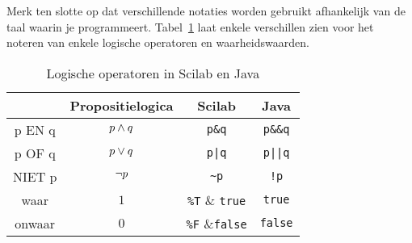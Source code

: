 Merk ten slotte op dat verschillende notaties worden gebruikt afhankelijk van de taal waarin je programmeert. Tabel~\ref{tab:log_op_sci_java} laat enkele verschillen zien voor het noteren van enkele logische operatoren en waarheidswaarden.
\begin{table}
\caption{Logische operatoren in Scilab en Java}
\label{tab:log_op_sci_java}
\centering
\begin{tabular}{cccc}
\toprule & Propositielogica & Scilab & Java \\
\midrule
p EN q & $p\wedge q$ & \verb+p&q+ & \verb+p&&q+ \\
p OF q & $p\vee q$ & \verb+p|q+ &\verb+p||q+\\
NIET p & $\neg p$ &\verb+~p+ & \verb+!p+ \\
waar & $1$ & \verb+%T+ & \verb+true+\\
onwaar & $0$ & \verb+%F+ &\verb+false+\\
\bottomrule
\end{tabular}
\end{table}


\newpage

